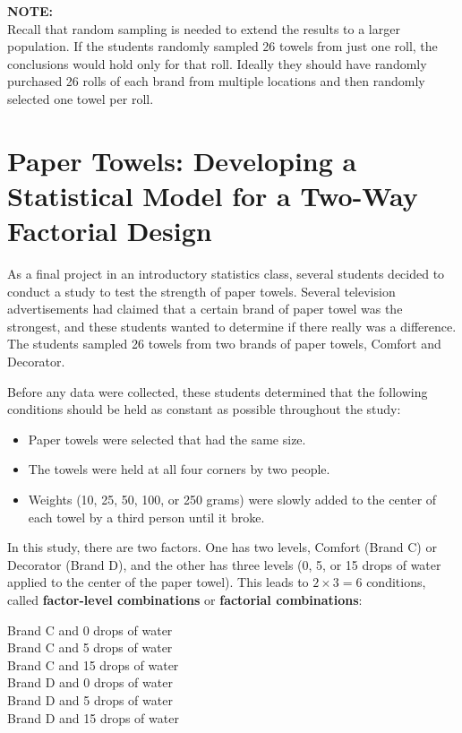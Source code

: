 \documentclass[
]{report}
\providecommand{\tightlist}{%
  \setlength{\itemsep}{0pt}\setlength{\parskip}{0pt}}
\begin{document}
\large

\textbf{NOTE:}\\
Recall that random sampling is needed to extend the results to a larger population. If the students randomly sampled 26 towels from just one roll, the conclusions would hold only for that roll. Ideally they should have randomly purchased 26 rolls of each brand from multiple locations and then randomly selected one towel per roll.
\normalsize

\section{\texorpdfstring{\textbf{Paper Towels: Developing a Statistical Model for a Two-Way Factorial Design}}{Paper Towels: Developing a Statistical Model for a Two-Way Factorial Design}}\label{paper-towels-developing-a-statistical-model-for-a-two-way-factorial-design}

As a final project in an introductory statistics class, several students decided to conduct a study to test the strength of paper towels. Several television advertisements had claimed that a certain brand of paper towel was the strongest, and these students wanted to determine if there really was a difference. The students sampled 26 towels from two brands of paper towels, Comfort and Decorator.

Before any data were collected, these students determined that the following conditions should be held as constant as possible throughout the study:

\begin{itemize}
\tightlist
\item
  Paper towels were selected that had the same size.
\item
  The towels were held at all four corners by two people.
\item
  Weights (10, 25, 50, 100, or 250 grams) were slowly added to the center of each towel by a third person until it broke.
\end{itemize}

In this study, there are two factors. One has two levels, Comfort (Brand C) or Decorator (Brand D), and the other has three levels (0, 5, or 15 drops of water applied to the center of the paper towel). This leads to \(2 \times 3 = 6\) conditions, called \textbf{factor-level combinations} or \textbf{factorial combinations}:

Brand C and 0 drops of water\\
Brand C and 5 drops of water\\
Brand C and 15 drops of water\\
Brand D and 0 drops of water\\
Brand D and 5 drops of water\\
Brand D and 15 drops of water
\end{document}
